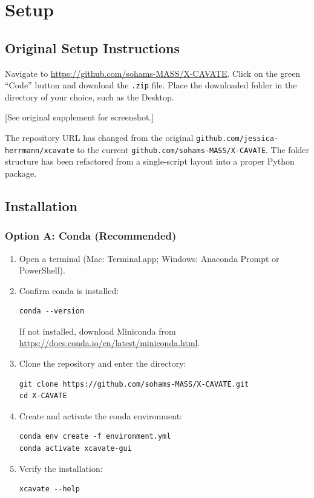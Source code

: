 \documentclass[11pt,letterpaper]{article}
\newcommand{\code}[1]{\texttt{#1}}
\begin{document}
\section{Setup}
\label{sec:setup}

\subsection{Original Setup Instructions}

Navigate to \url{https://github.com/sohams-MASS/X-CAVATE}.
Click on the green ``Code'' button and download the \code{.zip} file.
Place the downloaded folder in the directory of your choice, such as the
Desktop.

[See original supplement for screenshot.]

\begin{claudebox}
The repository URL has changed from the original
\code{github.com/jessica-herrmann/xcavate} to the current
\code{github.com/sohams-MASS/X-CAVATE}. The folder structure has been
refactored from a single-script layout into a proper Python package.
\end{claudebox}

\subsection{Installation}

\subsubsection{Option A: Conda (Recommended)}

\begin{enumerate}[leftmargin=*]
    \item Open a terminal (Mac: Terminal.app; Windows: Anaconda Prompt or PowerShell).
    \item Confirm conda is installed:
    \begin{lstlisting}
conda --version
    \end{lstlisting}
    If not installed, download Miniconda from \url{https://docs.conda.io/en/latest/miniconda.html}.
    \item Clone the repository and enter the directory:
    \begin{lstlisting}
git clone https://github.com/sohams-MASS/X-CAVATE.git
cd X-CAVATE
    \end{lstlisting}
    \item Create and activate the conda environment:
    \begin{lstlisting}
conda env create -f environment.yml
conda activate xcavate-gui
    \end{lstlisting}
    \item Verify the installation:
    \begin{lstlisting}
xcavate --help
    \end{lstlisting}
\end{enumerate}
\end{document}
